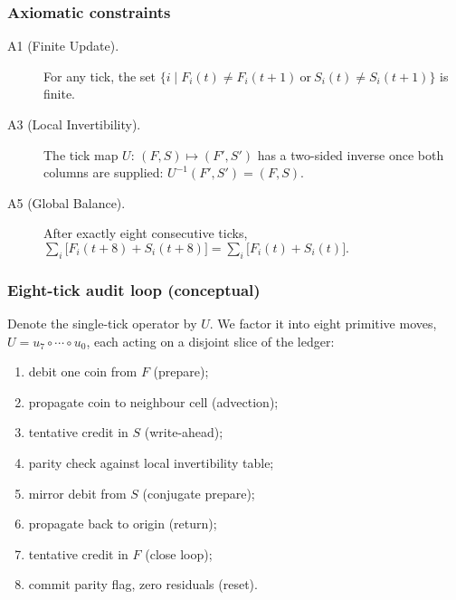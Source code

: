 \documentclass[11pt,oneside]{book}
\begin{document}
\subsubsection{Axiomatic constraints}
\label{subsubsec:ledger-axioms}
\begin{description}
  \item[A1 (Finite Update).]  
    For any tick, the set \(\{i \mid F_{i}(t)\neq F_{i}(t{+}1)\ \text{or}\
      S_{i}(t)\neq S_{i}(t{+}1)\}\) is finite.
  \item[A3 (Local Invertibility).]  
    The tick map \(U:\,(F,S)\!\mapsto\!(F',S')\) has a two-sided inverse once
    both columns are supplied: \(U^{-1}(F',S')=(F,S)\).
  \item[A5 (Global Balance).]  
    After exactly eight consecutive ticks,
    \(\displaystyle
       \sum_{i}\bigl[F_{i}(t{+}8)+S_{i}(t{+}8)\bigr]
       =
       \sum_{i}\bigl[F_{i}(t)+S_{i}(t)\bigr].
    \)
\end{description}

\subsubsection{Eight-tick audit loop (conceptual)}
\label{subsubsec:audit-loop}
Denote the single-tick operator by \(U\).  
We factor it into eight primitive moves,
\(U = u_{7}\circ\cdots\circ u_{0}\),
each acting on a disjoint slice of the ledger:

\begin{enumerate}[label=\textbf{Tick \arabic*:}, leftmargin=2.5em]
  \item debit one coin from \(F\) (prepare);
  \item propagate coin to neighbour cell (advection);
  \item tentative credit in \(S\) (write-ahead);
  \item parity check against local invertibility table;
  \item mirror debit from \(S\) (conjugate prepare);
  \item propagate back to origin (return);
  \item tentative credit in \(F\) (close loop);
  \item commit parity flag, zero residuals (reset).
\end{enumerate}
\end{document}
